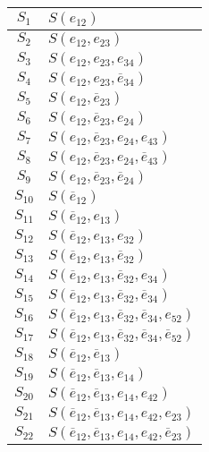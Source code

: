 \documentclass[a4paper]{article}
\begin{document}
		\ \\
		\begin{tabular}{|c|l|} \hline
		$ S_1 $    & $ S(e_{12}) $ \\ \hline
		$ S_2 $    & $ S(e_{12}, e_{23}) $ \\ \hline
		$ S_3 $    & $ S(e_{12}, e_{23}, e_{34}) $ \\ \hline
		$ S_4 $    & $ S(e_{12}, e_{23}, \overline{e}_{34}) $ \\ \hline
		$ S_5 $    & $ S(e_{12}, \overline{e}_{23}) $ \\ \hline
		$ S_6 $    & $ S(e_{12}, \overline{e}_{23}, e_{24}) $ \\ \hline
		$ S_7 $    & $ S(e_{12}, \overline{e}_{23}, e_{24}, e_{43}) $ \\ \hline
		$ S_8 $    & $ S(e_{12}, \overline{e}_{23}, e_{24}, \overline{e}_{43}) $ \\ \hline
		$ S_9 $    & $ S(e_{12}, \overline{e}_{23}, \overline{e}_{24}) $ \\ \hline
		$ S_{10} $ & $ S(\overline{e}_{12}) $ \\ \hline
		$ S_{11} $ & $ S(\overline{e}_{12}, e_{13}) $ \\ \hline
		$ S_{12} $ & $ S(\overline{e}_{12}, e_{13}, e_{32}) $ \\ \hline
		$ S_{13} $ & $ S(\overline{e}_{12}, e_{13}, \overline{e}_{32}) $ \\ \hline
		$ S_{14} $ & $ S(\overline{e}_{12}, e_{13}, \overline{e}_{32}, e_{34}) $ \\ \hline
		$ S_{15} $ & $ S(\overline{e}_{12}, e_{13}, \overline{e}_{32}, \overline{e}_{34}) $ \\ \hline
		$ S_{16} $ & $ S(\overline{e}_{12}, e_{13}, \overline{e}_{32}, \overline{e}_{34}, e_{52}) $ \\ \hline
		$ S_{17} $ & $ S(\overline{e}_{12}, e_{13}, \overline{e}_{32}, \overline{e}_{34}, \overline{e}_{52}) $ \\ \hline
		$ S_{18} $ & $ S(\overline{e}_{12}, \overline{e}_{13}) $ \\ \hline
		$ S_{19} $ & $ S(\overline{e}_{12}, \overline{e}_{13}, e_{14}) $ \\ \hline
		$ S_{20} $ & $ S(\overline{e}_{12}, \overline{e}_{13}, e_{14}, e_{42}) $ \\ \hline
		$ S_{21} $ & $ S(\overline{e}_{12}, \overline{e}_{13}, e_{14}, e_{42}, e_{23}) $ \\ \hline
		$ S_{22} $ & $ S(\overline{e}_{12}, \overline{e}_{13}, e_{14}, e_{42}, \overline{e}_{23}) $ \\ \hline

\end{tabular}
\end{document}
